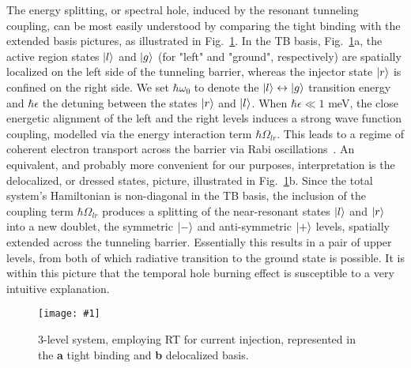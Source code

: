 \documentclass[reprint,secnumarabic,amssymb, nobibnotes, aip, prd]{revtex4-1}
\newcommand{\vspacec}{\vspace{-0.3cm}}
\newcommand{\includegraphicsXL}[1]{\texttt{[image: \#1]}}
\begin{document}
\vspacec
The energy splitting, or spectral hole, induced by the resonant tunneling coupling, can be most easily understood by comparing the tight binding with the extended basis pictures, as illustrated in Fig.~\ref{fig:basisnew}. In the TB basis, Fig.~\ref{fig:basisnew}a, the active region states $\ket{l}$ and $\ket{g}$ (for "left" and "ground", respectively) are spatially localized on the left side of the tunneling barrier, whereas the injector state $\ket{r}$ is confined on the right side. We set $\hbar\omega_0$ to denote the $\ket{l} \leftrightarrow \ket{g}$ transition energy and $\hbar\epsilon$ the detuning between the states $\ket{r}$ and $\ket{l}$. When $\hbar \epsilon \ll 1 $ meV, the close energetic alignment of the left and the right levels induces a strong wave function coupling, modelled via the energy interaction term $\hbar\Omega_{lr}$. This leads to a regime of coherent electron transport across the barrier via Rabi oscillations~\cite{callebaut2005importance}. An equivalent, and probably more convenient for our purposes, interpretation is the delocalized, or dressed states, picture, illustrated in Fig.~\ref{fig:basisnew}b. Since the total system's Hamiltonian is non-diagonal in the TB basis, the inclusion of the coupling term $\hbar\Omega_{lr}$ produces a splitting of the near-resonant states $\ket{l}$ and $\ket{r}$ into a new doublet, the symmetric $\ket{-}$ and anti-symmetric $\ket{+}$ levels, spatially extended across the tunneling barrier. Essentially this results in a pair of upper levels, from both of which radiative transition to the ground state is possible. It is within this picture that the temporal hole burning effect is susceptible to a very intuitive explanation. 
\begin{figure}[h!]
	\begin{center}
		\includegraphicsXL{IMGS/basisnew.eps}
		\caption{3-level system, employing RT for current injection, represented in the \textbf{a} tight binding and \textbf{b} delocalized basis.} \label{fig:basisnew}
	\end{center}	
\end{figure}
\end{document}
